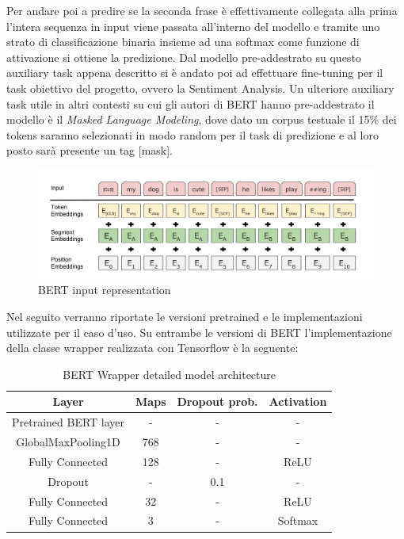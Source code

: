 Per andare poi a predire se la seconda frase è effettivamente collegata alla prima l'intera sequenza in input viene passata all'interno del modello e tramite uno strato di classificazione binaria insieme ad una softmax come funzione di attivazione si ottiene la predizione.
\newline
Dal modello pre-addestrato su questo auxiliary task appena descritto si è andato poi ad effettuare fine-tuning per il task obiettivo del progetto, ovvero la Sentiment Analysis.
Un ulteriore auxiliary task utile in altri contesti su cui gli autori di BERT hanno pre-addestrato il modello è il \textit{Masked Language Modeling}, dove dato un corpus testuale il 15\% dei tokens saranno selezionati in modo random per il task di predizione e al loro posto sarà presente un tag [mask].

\begin{figure}[!ht]
    \centering
    \includegraphics[width=15cm]{./images/bert.png}
    \caption{BERT input representation}
\end{figure}

\newpage
Nel seguito verranno riportate le versioni pretrained e le implementazioni utilizzate per il caso d'uso.\newline
Su entrambe le versioni di BERT l'implementazione della classe wrapper realizzata con Tensorflow è la seguente:
\begin{table}[!ht]
\centering
\caption{BERT Wrapper detailed model architecture}
\begin{tabular}{cccc}
\toprule
Layer & Maps & Dropout prob. & Activation \\
\midrule
    Pretrained BERT layer & - & - & - \\
    GlobalMaxPooling1D & 768 & - & - \\
    Fully Connected & 128 & - & ReLU\\
    Dropout & - & 0.1 & - \\
    Fully Connected & 32 & - & ReLU\\
    Fully Connected & 3 & - & Softmax\\
\bottomrule
\end{tabular}
\end{table}


